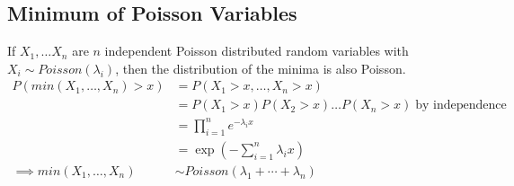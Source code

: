 \documentclass[../../probability-notes.tex]{subfiles}
\begin{document}
    \subsection{Minimum of Poisson Variables}
    If $X_{1}, \ldots X_{n}$ are $n$ independent Poisson distributed random variables with $X_{i} \sim Poisson(\lambda_{i})$, then the distribution of the minima is also Poisson.
    \begin{align*}
        P(min(X_{1}, \ldots, X_{n}) > x) &= P(X_{1} > x, \ldots, X_{n} > x)\\
        &= P(X_{1} > x) P(X_{2} > x) \ldots P(X_{n} > x) \; \text{by independence}\\
        &= \prod_{i=1}^{n} e^{-\lambda_{i} x}\\
        &= \exp(-\sum_{i=1}^{n} \lambda_{i} x)\\
        \implies min(X_{1}, \ldots, X_{n}) &\sim Poisson(\lambda_{1} + \cdots + \lambda_{n})
    \end{align*}
\end{document}
